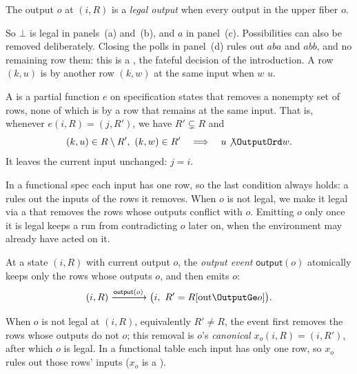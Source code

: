 \begin{definition}
\label{def:exposable}
The output $o$ at $(i,R)$ is a \emph{legal output} when every output in the
upper fiber \outrel $o$.
\end{definition}

So $\bot$ is legal in panels~(a) and~(b), and $a$ in panel~(c).  Possibilities
can also be removed deliberately.  Closing the polls in panel~(d) rules out
$aba$ and $abb$, and no remaining row \outrel them: this is a \commitment,
the fateful decision of the introduction.  A row $(k,u)$ is \emph{\outrelpast} by another
row $(k,w)$ at the same input when $w$ \outrel $u$.

\begin{definition}[\Commitment]
\label{def:commitment}
A \emph{\commitment} is a partial function $e$ on specification states that
removes a nonempty set of rows, none of which is \outrelpast by a row that
remains at the same input.  That is, whenever $e(i,R)=(j,R')$, we have
$R'\subsetneq R$ and
\begin{equation}
  (k,u)\in R\setminus R',\ (k,w)\in R'
  \quad\Longrightarrow\quad
  u\not\OutputOrd w.
  \label{eq:commitment-unsubsumed}
\end{equation}
It leaves the current input unchanged: $j=i$.
\end{definition}

In a functional spec each input has one row, so the last condition always
holds: a \commitment rules out the inputs of the rows it removes.  When $o$ is not legal,
we make it legal via a \commitment that removes the rows whose outputs conflict
with $o$.  Emitting $o$ only once it is legal keeps a run from
contradicting $o$ later on, when the environment may already have acted on it.

\begin{definition}
\label{def:output-event}
At a state $(i,R)$ with current output $o$, the \emph{output event}
$\mathsf{output}(o)$ atomically keeps only the rows whose outputs \outrelbase $o$,
and then emits $o$:
\begin{equation}
  (i,R)\xrightarrow{\mathsf{output}(o)}\bigl(i,\ R' = R[\mathrm{out}\OutputGe o]\bigr).
  \label{eq:output-action}
\end{equation}
\end{definition}

\begin{definition}
\label{def:canonical-commitment-functional}
When $o$ is not legal at $(i,R)$, equivalently $R'\neq R$, the event first
removes the rows whose outputs do not \outrelbase $o$; this removal is
$o$'s \emph{canonical \commitment} $x_o(i,R)=(i,R')$, after which $o$ is legal.  In a functional table each
input has only one row, so $x_o$ rules out those rows' inputs ($x_o$ is a \commitment).
\end{definition}

